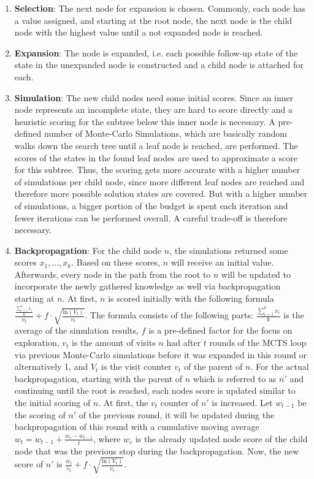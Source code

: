 \begin{enumerate}
    \item \textbf{Selection}: The next node for expansion is chosen.
    Commonly, each node has a value assigned, and starting at the root node, the next node is the child node with the highest value until a not expanded node is reached.
    \item \textbf{Expansion}: The node is expanded, i.e. each possible follow-up state of the state in the unexpanded node is constructed and a child node is attached for each.
    \item \textbf{Simulation}: The new child nodes need some initial scores.
    Since an inner node represents an incomplete state, they are hard to score directly and a heuristic scoring for the subtree below this inner node is necessary.
    A pre-defined number of Monte-Carlo Simulations, which are basically random walks down the search tree until a leaf node is reached, are performed.
    The scores of the states in the found leaf nodes are used to approximate a score for this subtree.
    Thus, the scoring gets more accurate with a higher number of simulations per child node, since more different leaf nodes are reached and therefore more possible solution states are covered.
    But with a higher number of simulations, a bigger portion of the budget is spent each iteration and fewer iterations can be performed overall.
    A careful trade-off is therefore necessary.
    \item \textbf{Backpropagation}: For the child node $n$, the simulations returned some scores $x_1, ..., x_k$.
    Based on these scores, $n$ will receive an initial value.
    Afterwards, every node in the path from the root to $n$ will be updated to incorporate the newly gathered knowledge as well via backpropagation starting at $n$.
    At first, $n$ is scored initially with the following formula $\frac{\frac{\sum_{i=1}^k x_i}{k}}{v_t} + f \cdot \sqrt{\frac{\mathrm{ln} (V_t)}{v_t}}$.
    The formula consists of the following parts: $\frac{\sum_{i=1}^k x_i}{k}$ is the average of the simulation results, $f$ is a pre-defined factor for the focus on exploration, $v_t$ is the amount of visits $n$ had after $t$ rounds of the MCTS loop via previous Monte-Carlo simulations before it was expanded in this round or alternatively 1, and $V_t$ is the visit counter $v_t$ of the parent of $n$.
    For the actual backpropagation, starting with the parent of $n$ which is referred to as $n'$ and continuing until the root is reached, each nodes score is updated similar to the initial scoring of $n$.
    At first, the $v_t$ counter of $n'$ is increased.
    Let $w_{t-1}$ be the scoring of $n'$ of the previous round, it will be updated during the backpropagation of this round with a cumulative moving average $w_t=w_{t-1} + \frac{w_c - w_{t-1}}{t}$, where $w_c$ is the already updated node score of the child node that was the previous stop during the backpropagation.
    Now, the new score of $n'$ is $\frac{w_t}{v_t} + f \cdot \sqrt{\frac{\mathrm{ln} (V_t)}{v_t}}$.
\end{enumerate}
